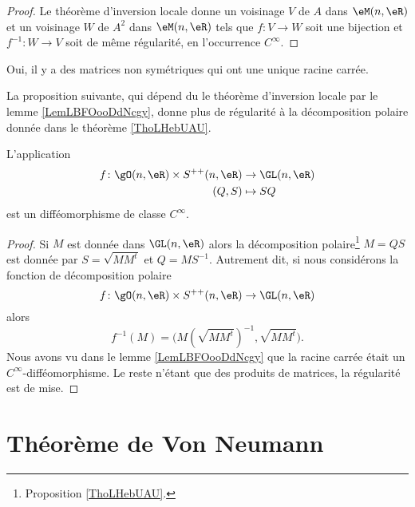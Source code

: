 \begin{proof}
    Le théorème d'inversion locale donne un voisinage \( V\) de $A$ dans \( \eM(n,\eR)\) et un voisinage \( W\) de \( A^2\) dans \( \eM(n,\eR)\) tels que \( f\colon V\to W\) soit une bijection  et \( f^{-1}\colon W\to V\) soit de même régularité, en l'occurrence \( C^{\infty}\).
\end{proof}

\begin{remark}
    Oui, il y a des matrices non symétriques qui ont une unique racine carrée.
\end{remark}

La proposition suivante, qui dépend du le théorème d'inversion locale par le lemme \ref{LemLBFOooDdNcgy}, donne plus de régularité à la décomposition polaire donnée dans le théorème \ref{ThoLHebUAU}.
\begin{proposition}       \label{PropWCXAooDuFMjn}
    L'application
    \begin{equation}
        \begin{aligned}
            f\colon \gO(n,\eR)\times S^{++}(n,\eR)&\to \GL(n,\eR) \\
            (Q,S)&\mapsto SQ 
        \end{aligned}
    \end{equation}
    est un difféomorphisme de classe \( C^{\infty}\).
\end{proposition}

\begin{proof}
    Si \( M\) est donnée dans \( \GL(n,\eR)\) alors la décomposition polaire\footnote{Proposition \ref{ThoLHebUAU}.} \( M=QS\) est donnée par \( S=\sqrt{MM^t}\) et \( Q=MS^{-1}\). Autrement dit, si nous considérons la fonction de décomposition polaire
    \begin{equation}
        f\colon \gO(n,\eR)\times S^{++}(n,\eR)\to \GL(n,\eR)
    \end{equation}
    alors
    \begin{equation}
        f^{-1}(M)=\big(  M(\sqrt{MM^t})^{-1},\sqrt{MM^t}  \big).
    \end{equation}
    Nous avons vu dans le lemme \ref{LemLBFOooDdNcgy} que la racine carrée était un \( C^{\infty}\)-difféomorphisme. Le reste n'étant que des produits de matrices, la régularité est de mise.
\end{proof}

\section{Théorème de Von Neumann}

